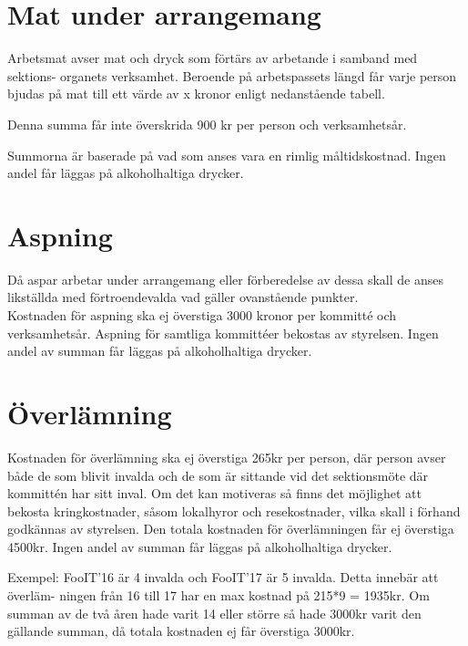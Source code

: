 \documentclass[11pt, includeaddress]{classes/cthit}
\begin{document}
\section{Mat under arrangemang}
Arbetsmat avser mat och dryck som förtärs av arbetande i samband med sektions-
organets verksamhet. Beroende på arbetspassets längd får varje person bjudas på
mat till ett värde av x kronor enligt nedanstående tabell.

\addvbuffer[\the\baselineskip]{\begin{tabular}{ l  c  c  c}
	\centering
	Timmar & [0-3] & (3-6] & (6-$\infty$) \\
	\hline
	Kronor & 0 & 75 & 150 \\
\end{tabular}}

    Denna summa får inte överskrida 900 kr per person och verksamhetsår.

    Summorna är baserade på vad som anses vara en rimlig
    måltidskostnad. Ingen andel får läggas på alkoholhaltiga drycker.

\section{Aspning}
Då aspar arbetar under arrangemang eller förberedelse av dessa skall de anses likställda med förtroendevalda vad gäller ovanstående punkter. \\

Kostnaden för aspning ska ej överstiga 3000 kronor per kommitté och verksamhetsår.
Aspning för samtliga kommittéer bekostas av styrelsen. Ingen andel av summan får läggas på alkoholhaltiga drycker.

\section{Överlämning}
Kostnaden för överlämning ska ej överstiga 265kr per person, där person avser både de som blivit invalda och de som är sittande vid det sektionsmöte där kommittén har sitt inval. Om det kan motiveras så finns det möjlighet att bekosta kringkostnader, såsom lokalhyror och resekostnader, vilka skall i förhand godkännas av styrelsen. Den totala kostnaden för överlämningen får ej överstiga 4500kr. Ingen andel av summan får läggas på alkoholhaltiga drycker.

Exempel: FooIT’16 är 4 invalda och FooIT’17 är 5 invalda. Detta innebär att överläm- ningen från 16 till 17 har en max kostnad på 215*9 = 1935kr. Om summan av de två åren hade varit 14 eller större så hade 3000kr varit den gällande summan, då totala kostnaden ej får överstiga 3000kr.
\end{document}
